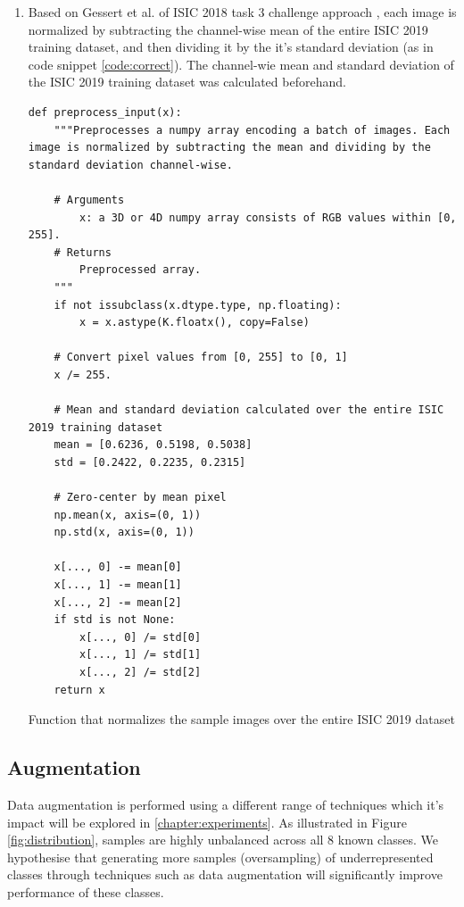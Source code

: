 \begin{enumerate}
    \item Based on Gessert et al. of ISIC 2018 task 3 challenge approach \cite{gessert2018}, each image is normalized by subtracting the channel-wise mean of the entire ISIC 2019 training dataset, and then dividing it by the it's standard deviation (as in code snippet \ref{code:correct}). The channel-wie mean and standard deviation of the ISIC 2019 training dataset was calculated beforehand. \par
    
        \begin{listing}[ht]
        \begin{verbatim}
def preprocess_input(x):
    """Preprocesses a numpy array encoding a batch of images. Each image is normalized by subtracting the mean and dividing by the standard deviation channel-wise.
    
    # Arguments
        x: a 3D or 4D numpy array consists of RGB values within [0, 255].
    # Returns
        Preprocessed array.
    """
    if not issubclass(x.dtype.type, np.floating):
        x = x.astype(K.floatx(), copy=False)
    
    # Convert pixel values from [0, 255] to [0, 1] 
    x /= 255.
    
    # Mean and standard deviation calculated over the entire ISIC 2019 training dataset
    mean = [0.6236, 0.5198, 0.5038]
    std = [0.2422, 0.2235, 0.2315]
    
    # Zero-center by mean pixel
    np.mean(x, axis=(0, 1))
    np.std(x, axis=(0, 1))
    
    x[..., 0] -= mean[0]
    x[..., 1] -= mean[1]
    x[..., 2] -= mean[2]
    if std is not None:
        x[..., 0] /= std[0]
        x[..., 1] /= std[1]
        x[..., 2] /= std[2]
    return x
        \end{verbatim}
        \caption{Function that normalizes the sample images over the entire ISIC 2019 dataset}
        \label{code:correct}
        \end{listing}
    \end{enumerate}


\subsection{Augmentation}
\label{subsection:augmentation}
    
    Data augmentation is performed using a different range of techniques which it's impact will be explored in \autoref{chapter:experiments}. As illustrated in Figure \ref{fig:distribution}, samples are highly unbalanced across all 8 known classes. We hypothesise that generating more samples (oversampling) of underrepresented classes through techniques such as data augmentation will significantly improve performance of these classes. \par 
    
